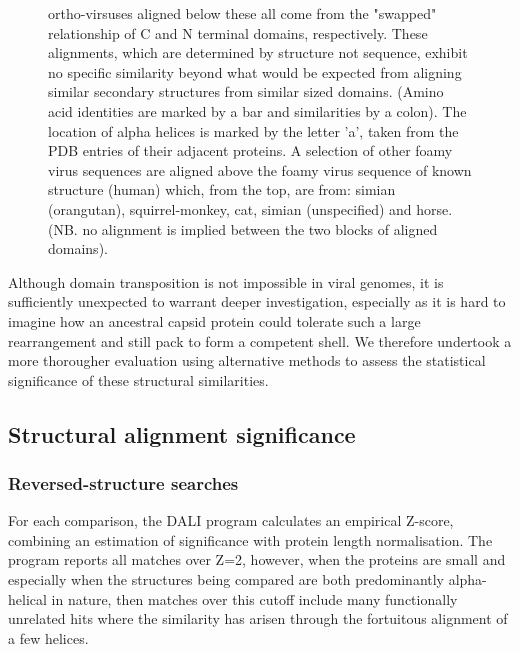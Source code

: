 \documentclass{bmcart}
\begin{document}
\begin{figure}
\begin{footnotesize}
{ortho-virsuses aligned below these all come from the "swapped" relationship of C and N terminal domains,
respectively.   These alignments, which are determined by structure not sequence, exhibit no
specific similarity beyond what would be expected from aligning similar secondary structures from
similar sized domains. (Amino acid identities are marked by a bar and similarities by a colon).
The location of alpha helices is marked by the letter 'a', taken from the PDB entries of their adjacent
proteins.  A selection of other foamy virus sequences are aligned above the foamy virus sequence
of known structure (human) which, from the top, are from: simian (orangutan), squirrel-monkey, cat,
simian (unspecified) and horse. (NB. no alignment is implied between the two blocks of aligned domains). 
}
\end{footnotesize}
\end{figure}

Although domain transposition is not impossible in viral genomes,  it is sufficiently
unexpected to warrant deeper investigation, especially as it is hard to imagine how an ancestral
capsid protein could tolerate such a large rearrangement and still pack to form a competent shell.
We therefore undertook a more thorougher evaluation using alternative methods to assess the statistical
significance of these structural similarities.

\subsection*{Structural alignment significance}

\subsubsection*{Reversed-structure searches}

For each comparison, the DALI program calculates an empirical Z-score, combining an estimation of
significance with protein length normalisation.   The program reports all matches over Z=2, however,
when the proteins are small and especially when the structures being compared are both predominantly
alpha-helical in nature, then matches over this cutoff include many functionally unrelated
hits where the similarity has arisen through the fortuitous alignment of a few helices.
\end{document}
